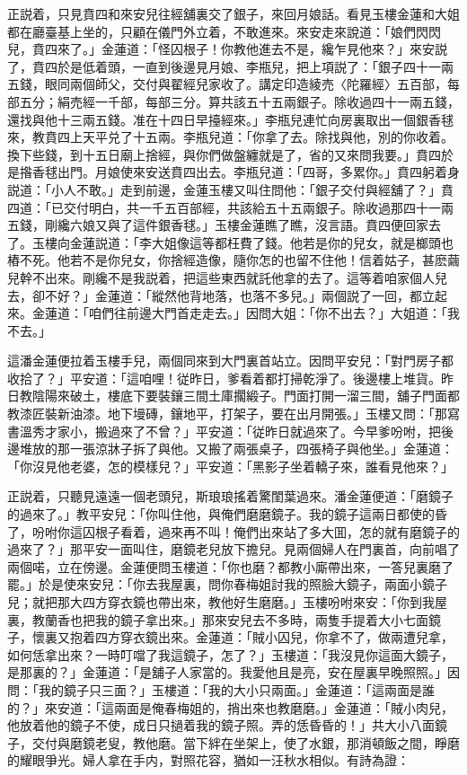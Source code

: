 正説着，只見賁四和來安兒往經舖裏交了銀子，來回月娘話。看見玉樓金蓮和大姐都在廳臺基上坐的，只顧在儀門外立着，不敢進來。來安走來說道：「娘們閃閃兒，賁四來了。」金蓮道：「怪囚根子！你教他進去不是，纔乍見他來？」來安説了，賁四於是低着頭，一直到後邊見月娘、李瓶兒，把上項説了：「銀子四十一兩五錢，眼同兩個師父，交付與翟經兒家收了。講定印造綾売〈陀羅經〉五百部，每部五分；絹売經一千部，每部三分。算共該五十五兩銀子。除收過四十一兩五錢，還找與他十三兩五錢。准在十四日早擡經來。」李瓶兒連忙向房裏取出一個銀香毬來，教賁四上天平兑了十五兩。李瓶兒道：「你拿了去。除找與他，別的你收着。換下些錢，到十五日廟上捨經，與你們做盤纏就是了，省的又來問我要。」賁四於是揝香毬出門。月娘使來安送賁四出去。李瓶兒道：「四哥，多累你。」賁四躬着身説道：「小人不敢。」走到前邊，金蓮玉樓又叫住問他：「銀子交付與經舖了？」賁四道：「已交付明白，共一千五百部經，共該給五十五兩銀子。除收過那四十一兩五錢，剛纔六娘又與了這件銀香毬。」玉樓金蓮瞧了瞧，沒言語。賁四便回家去了。玉樓向金蓮説道：「李大姐像這等都枉費了錢。他若是你的兒女，就是榔頭也樁不死。他若不是你兒女，你捨經造像，隨你怎的也留不住他！信着姑子，甚麽繭兒幹不出來。剛纔不是我説着，把這些東西就託他拿的去了。這等着咱家個人兒去，卻不好？」金蓮道：「縱然他背地落，也落不多兒。」兩個説了一回，都立起來。金蓮道：「咱們往前邊大門首走走去。」因問大姐：「你不出去？」大姐道：「我不去。」

這潘金蓮便拉着玉樓手兒，兩個同來到大門裏首站立。因問平安兒：「對門房子都收拾了？」平安道：「這咱哩！従昨日，爹看着都打掃乾淨了。後邊樓上堆貨。昨日教陰陽來破土，樓底下要裝鑲三間土庫擱緞子。門面打開一溜三間，舖子門面都教漆匠裝新油漆。地下墁磚，鑲地平，打架子，要在出月開張。」玉樓又問：「那寫書溫秀才家小，搬過來了不曾？」平安道：「従昨日就過來了。今早爹吩咐，把後邊堆放的那一張涼牀子拆了與他。又搬了兩張桌子，四張椅子與他坐。」金蓮道：「你沒見他老婆，怎的模樣兒？」平安道：「黑影子坐着轎子來，誰看見他來？」

正説着，只聽見遠遠一個老頭兒，斯琅琅搖着驚閨葉過來。潘金蓮便道：「磨鏡子的過來了。」教平安兒：「你叫住他，與俺們磨磨鏡子。我的鏡子這兩日都使的昏了，吩咐你這囚根子看着，過來再不叫！俺們出來站了多大囬，怎的就有磨鏡子的過來了？」那平安一面叫住，磨鏡老兒放下擔兒。見兩個婦人在門裏首，向前唱了兩個喏，立在傍邊。金蓮便問玉樓道：「你也磨？都教小廝帶出來，一答兒裏磨了罷。」於是使來安兒：「你去我屋裏，問你春梅姐討我的照臉大鏡子，兩面小鏡子兒；就把那大四方穿衣鏡也帶出來，教他好生磨磨。」玉樓吩咐來安：「你到我屋裏，教蘭香也把我的鏡子拿出來。」那來安兒去不多時，兩隻手提着大小七面鏡子，懷裏又抱着四方穿衣鏡出來。金蓮道：「賊小囚兒，你拿不了，做兩遭兒拿，如何恁拿出來？一時叮噹了我這鏡子，怎了？」玉樓道：「我沒見你這面大鏡子，是那裏的？」金蓮道：「是舖子人家當的。我愛他且是亮，安在屋裏早晚照照。」因問：「我的鏡子只三面？」玉樓道：「我的大小只兩面。」金蓮道：「這兩面是誰的？」來安道：「這兩面是俺春梅姐的，捎出來也教磨磨。」金蓮道：「賊小肉兒，他放着他的鏡子不使，成日只撾着我的鏡子照。弄的恁昏昏的！」共大小八面鏡子，交付與磨鏡老叟，教他磨。當下絆在坐架上，使了水銀，那消頓飯之間，睜磨的耀眼爭光。婦人拿在手内，對照花容，猶如一汪秋水相似。有詩為證：

